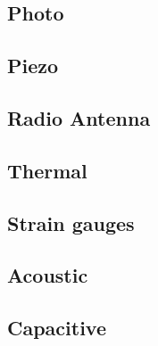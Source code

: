 \subsection{Photo}

\subsection{Piezo}

\subsection{Radio Antenna}

\subsection{Thermal}

\subsection{Strain gauges}

\subsection{Acoustic}

\subsection{Capacitive}



